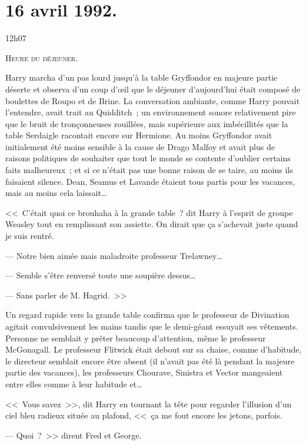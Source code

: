 
\section{16 avril 1992.}

12h07

\lettrine{H}{eure du déjeuner.}

\hplettrineextrapara
Harry marcha d'un pas lourd jusqu'à la table Gryffondor en majeure partie déserte et observa d'un coup d'œil que le déjeuner d'aujourd'hui était composé de boulettes de Roupo et de Brine. La conversation ambiante, comme Harry pouvait l'entendre, avait trait au Quidditch~; un environnement sonore relativement pire que le bruit de tronçonneuses rouillées, mais supérieure aux imbécillités que la table Serdaigle racontait encore sur Hermione. Au moins Gryffondor avait initialement été moins sensible à la cause de Drago Malfoy et avait plus de raisons politiques de souhaiter que tout le monde se contente d'oublier certains faits malheureux~; et si ce n'était pas une bonne raison de se taire, au moins ils faisaient silence. Dean, Seamus et Lavande étaient tous partis pour les vacances, mais au moins cela laissait…

<<~C'était quoi ce brouhaha à la grande table~? dit Harry à l'esprit de groupe Weasley tout en remplissant son assiette. On dirait que ça s'achevait juste quand je suis rentré.

--- Notre bien aimée mais maladroite professeur Trelawney…

--- Semble s'être renversé toute une soupière dessus…

--- Sans parler de M. Hagrid.~>>

Un regard rapide vers la grande table confirma que le professeur de Divination agitait convulsivement les mains tandis que le demi-géant essuyait ses vêtements. Personne ne semblait y prêter beaucoup d'attention, même le professeur McGonagall. Le professeur Flitwick était debout sur sa chaise, comme d'habitude, le directeur semblait encore être absent (il n'avait pas été là pendant la majeure partie des vacances), les professeurs Chourave, Sinistra et Vector mangeaient entre elles comme à leur habitude et…

<<~Vous savez~>>, dit Harry en tournant la tête pour regarder l'illusion d'un ciel bleu radieux située au plafond, <<~ça me fout encore les jetons, parfois.

--- Quoi~?~>> dirent Fred et George.

